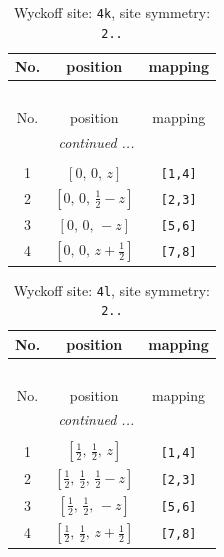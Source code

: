 \documentclass[fleqn,8pt]{jsarticle}
\begin{document}
\renewcommand{\arraystretch}{1.2}
\begin{longtable}{ccc}
\caption{Wyckoff site: {\tt 4k}, site symmetry: {\tt 2..}}
 \\
 \hline \hline
No. & position & mapping \\ \hline \endfirsthead

\multicolumn{2}{l}{\tablename\ \thetable{}} \\
 \hline \hline
No. & position & mapping \\ \hline \endhead

 \hline \hline
\multicolumn{2}{r}{\footnotesize\it continued ...} \\ \endfoot

 \hline \hline
\multicolumn{2}{r}{} \\ \endlastfoot

1 & $\left[ 0,\, 0,\, z \right]$ & {\tt [1,4]} \\ \hline
2 & $\left[ 0,\, 0,\, \frac{1}{2} - z \right]$ & {\tt [2,3]} \\ \hline
3 & $\left[ 0,\, 0,\, - z \right]$ & {\tt [5,6]} \\ \hline
4 & $\left[ 0,\, 0,\, z + \frac{1}{2} \right]$ & {\tt [7,8]} \\
\end{longtable}
\renewcommand{\arraystretch}{1.2}
\begin{longtable}{ccc}
\caption{Wyckoff site: {\tt 4l}, site symmetry: {\tt 2..}}
 \\
 \hline \hline
No. & position & mapping \\ \hline \endfirsthead

\multicolumn{2}{l}{\tablename\ \thetable{}} \\
 \hline \hline
No. & position & mapping \\ \hline \endhead

 \hline \hline
\multicolumn{2}{r}{\footnotesize\it continued ...} \\ \endfoot

 \hline \hline
\multicolumn{2}{r}{} \\ \endlastfoot

1 & $\left[ \frac{1}{2},\, \frac{1}{2},\, z \right]$ & {\tt [1,4]} \\ \hline
2 & $\left[ \frac{1}{2},\, \frac{1}{2},\, \frac{1}{2} - z \right]$ & {\tt [2,3]} \\ \hline
3 & $\left[ \frac{1}{2},\, \frac{1}{2},\, - z \right]$ & {\tt [5,6]} \\ \hline
4 & $\left[ \frac{1}{2},\, \frac{1}{2},\, z + \frac{1}{2} \right]$ & {\tt [7,8]} \\
\end{longtable}
\end{document}
